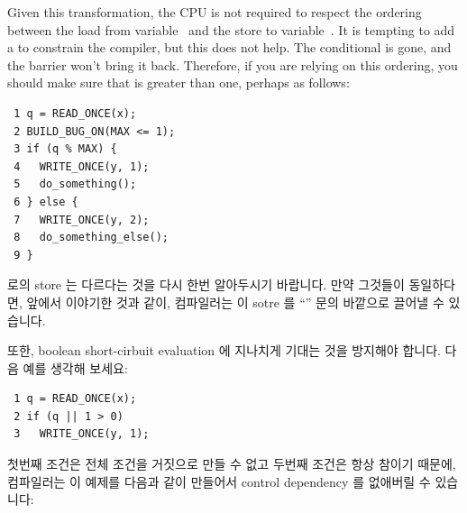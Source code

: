 \begin{enumerate}
Given this transformation, the CPU is not required to respect the ordering
between the load from variable~ and the store to variable~.
It is tempting to add a  to constrain the compiler,
but this does not help.
The conditional is gone, and the barrier won't bring it back.
Therefore, if you are relying on this ordering, you should make sure
that  is greater than one, perhaps as follows:
\fi

\vspace{5pt}
\begin{minipage}[t]{\columnwidth}
\scriptsize
\begin{verbatim}
 1 q = READ_ONCE(x);
 2 BUILD_BUG_ON(MAX <= 1);
 3 if (q % MAX) {
 4   WRITE_ONCE(y, 1);
 5   do_something();
 6 } else {
 7   WRITE_ONCE(y, 2);
 8   do_something_else();
 9 }
\end{verbatim}
\end{minipage}
\vspace{5pt}

 로의 store 는 다르다는 것을 다시 한번 알아두시기 바랍니다.
만약 그것들이 동일하다면, 앞에서 이야기한 것과 같이, 컴파일러는 이 sotre 를
``'' 문의 바깥으로 끌어낼 수 있습니다.

또한, boolean short-cirbuit evaluation 에 지나치게 기대는 것을 방지해야 합니다.
다음 예를 생각해 보세요:

\vspace{5pt}
\begin{minipage}[t]{\columnwidth}
\scriptsize
\begin{verbatim}
 1 q = READ_ONCE(x);
 2 if (q || 1 > 0)
 3   WRITE_ONCE(y, 1);
\end{verbatim}
\end{minipage}
\vspace{5pt}

첫번째 조건은 전체 조건을 거짓으로 만들 수 없고 두번째 조건은 항상 참이기
때문에, 컴파일러는 이 예제를 다음과 같이 만들어서 control dependency 를
없애버릴 수 있습니다:

\end{enumerate}
